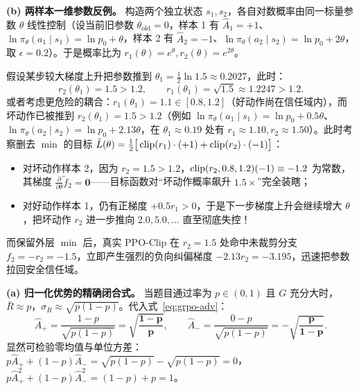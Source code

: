 \textbf{(b) 两样本一维参数反例。} 构造两个独立状态 $s_1, s_2$，各自对数概率由同一标量参数 $\theta$ 线性控制（设当前旧参数 $\theta_{\mathrm{old}} = 0$，样本 1 有 $\hat{A}_1 = +1$、$\ln\pi_\theta(a_1\mid s_1) = \ln p_0 + \theta$，样本 2 有 $\hat{A}_2 = -1$、$\ln\pi_\theta(a_2\mid s_2) = \ln p_0 + 2\theta$，取 $\epsilon = 0.2$）。于是概率比为 $r_1(\theta) = e^\theta, r_2(\theta) = e^{2\theta}$。

假设某步较大梯度上升把参数推到 $\theta_1 = \frac{1}{2}\ln 1.5 \approx 0.2027$，此时：
\[
  r_2(\theta_1) = 1.5 > 1.2, \qquad r_1(\theta_1) = \sqrt{1.5} \approx 1.2247 > 1.2.
\]
或者考虑更危险的耦合：$r_1(\theta_1) = 1.1 \in [0.8, 1.2]$（好动作尚在信任域内），而坏动作已被推到 $r_2(\theta_1) = 1.5 > 1.2$（例如 $\ln\pi_\theta(a_1\mid s_1) = \ln p_0 + 0.5\theta$、$\ln\pi_\theta(a_2\mid s_2) = \ln p_0 + 2.13\theta$，在 $\theta_1 \approx 0.19$ 处有 $r_1 \approx 1.10, r_2 \approx 1.50$）。此时考察删去 $\min$ 的目标 $\tilde{L}(\theta) = \frac{1}{2}\big[\operatorname{clip}(r_1)\cdot(+1) + \operatorname{clip}(r_2)\cdot(-1)\big]$：
\begin{itemize}
  \item 对坏动作样本 2，因为 $r_2 = 1.5 > 1.2$，$\operatorname{clip}(r_2, 0.8, 1.2)(-1) \equiv -1.2$ 为常数，其梯度 $\frac{\partial}{\partial \theta}\tilde{f}_2 = \mathbf{0}$——目标函数对“坏动作概率飙升 $1.5\times$”完全装瞎；
  \item 对好动作样本 1，仍有正梯度 $+0.5 r_1 > 0$，于是下一步梯度上升会继续增大 $\theta$，把坏动作 $r_2$ 进一步推向 $2.0, 5.0, \dots$ 直至彻底失控！
\end{itemize}
而保留外层 $\min$ 后，真实 PPO-Clip 在 $r_2 = 1.5$ 处命中未裁剪分支 $f_2 = -r_2 = -1.5$，立即产生强烈的负向纠偏梯度 $-2.13 r_2 = -3.195$，迅速把参数拉回安全信任域。


\textbf{(a) 归一化优势的精确闭合式。} 当题目通过率为 $p \in (0, 1)$ 且 $G$ 充分大时，$\bar{R} \approx p$，$\sigma_R \approx \sqrt{p(1 - p)}$。代入式~\eqref{eq:grpo-adv}：
\[
  \hat{A}_+ = \frac{1 - p}{\sqrt{p(1 - p)}} = \mathbf{\sqrt{\frac{1 - p}{p}}}, \qquad
  \hat{A}_- = \frac{0 - p}{\sqrt{p(1 - p)}} = \mathbf{-\sqrt{\frac{p}{1 - p}}}.
\]
显然可检验零均值与单位方差：$p \hat{A}_+ + (1 - p)\hat{A}_- = \sqrt{p(1-p)} - \sqrt{p(1-p)} = 0$，$p\hat{A}_+^2 + (1-p)\hat{A}_-^2 = (1-p) + p = 1$。

